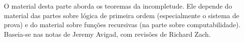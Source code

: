 \documentclass[../../include/open-logic-part]{subfiles}
\begin{document}

\begin{editorial}
 O material desta parte aborda os teoremas da incompletude. Ele depende
 do material das partes sobre lógica de primeira ordem (especialmente o
 sistema de prova) e do material sobre funções recursivas (na parte sobre
 computabilidade). Baseia-se nas notas de Jeremy Avigad, com revisões de
 Richard Zach.
\end{editorial}






\OLEndPartHook
\end{document}
